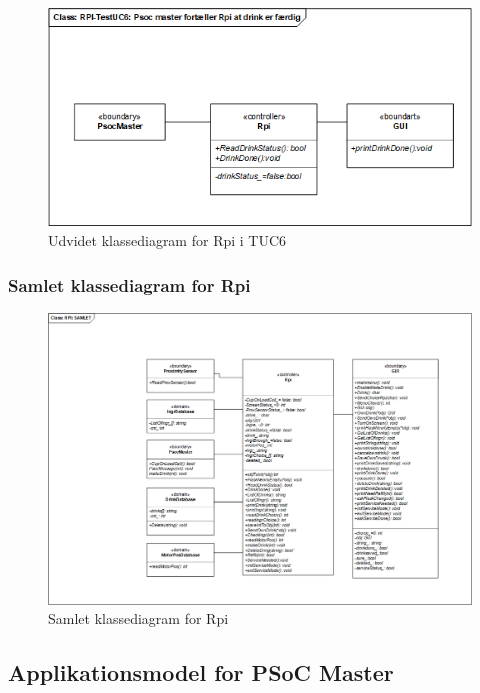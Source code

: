 \begin{figure}[H]
    \centering
    \includegraphics[width=1\textwidth]{Images/Applikationsmodeller/rpi/rpi_UdvidetklassediagramTestUC6.png}
    \caption{Udvidet klassediagram for Rpi i TUC6}
    \label{fig:UcdTUC6Rpi}
\end{figure}

\subsubsection{Samlet klassediagram for Rpi}

\begin{figure}[H]
    \centering
    \includegraphics[width=1\textwidth]{Images/Applikationsmodeller/rpi/Samlet_klassediagram.png}
    \caption{Samlet klassediagram for Rpi}
    \label{fig:Samlet - Rpi}
\end{figure}

\subsection{Applikationsmodel for PSoC Master}
